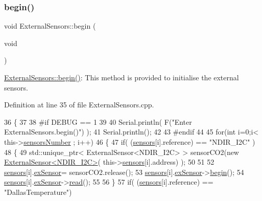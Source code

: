 \subsubsection{\texorpdfstring{begin()}{begin()}}
{\footnotesize\ttfamily void External\+Sensors\+::begin (\begin{DoxyParamCaption}\item[{void}]{ }\end{DoxyParamCaption})}

\hyperlink{class_external_sensors_a58ede0d786a86417254708870f04a21e}{External\+Sensors\+::begin()}\+: This method is provided to initialise the external sensors. 

Definition at line 35 of file External\+Sensors.\+cpp.


\begin{DoxyCode}
36 \{
37 
38 \textcolor{preprocessor}{#if DEBUG == 1}
39 
40     Serial.println( F(\textcolor{stringliteral}{"Enter ExternalSensors.begin()"}) );
41     Serial.println();
42 
43 \textcolor{preprocessor}{#endif }
44 
45     \textcolor{keywordflow}{for}(\textcolor{keywordtype}{int} i=0;i< this->\hyperlink{class_external_sensors_a58e4fbf9adeae787d92be5fa33043b5d}{sensorsNumber} ; i++)
46     \{
47         \textcolor{keywordflow}{if}( (\hyperlink{class_external_sensors_a284233f884fcf00154a44740cf1d9e1e}{sensors}[i].reference) == \textcolor{stringliteral}{"NDIR\_I2C"} )
48         \{   
49             std::unique\_ptr< ExternalSensor<NDIR\_I2C> > sensorCO2(\textcolor{keyword}{new} 
      \hyperlink{class_external_sensor_3_01_n_d_i_r___i2_c_01_4}{ExternalSensor<NDIR\_I2C>}( this->\hyperlink{class_external_sensors_a284233f884fcf00154a44740cf1d9e1e}{sensors}[i].address) );
50 
51 
52             \hyperlink{class_external_sensors_a284233f884fcf00154a44740cf1d9e1e}{sensors}[i].\hyperlink{struct_external_sensors_1_1sensor_a9bca150fd468b8d0e090e6d72c5c2b48}{exSensor}= sensorCO2.release();
53             \hyperlink{class_external_sensors_a284233f884fcf00154a44740cf1d9e1e}{sensors}[i].\hyperlink{struct_external_sensors_1_1sensor_a9bca150fd468b8d0e090e6d72c5c2b48}{exSensor}->\hyperlink{class_base_external_sensor_a87d132803d4f4fdd4e66332809f0c9a0}{begin}();
54             \hyperlink{class_external_sensors_a284233f884fcf00154a44740cf1d9e1e}{sensors}[i].\hyperlink{struct_external_sensors_1_1sensor_a9bca150fd468b8d0e090e6d72c5c2b48}{exSensor}->\hyperlink{class_base_external_sensor_a1564f16deacf57b51b9948ac29db4291}{read}();
55 
56         \}
57         \textcolor{keywordflow}{if}( (\hyperlink{class_external_sensors_a284233f884fcf00154a44740cf1d9e1e}{sensors}[i].reference) == \textcolor{stringliteral}{"DallasTemperature"})

\end{DoxyCode}
